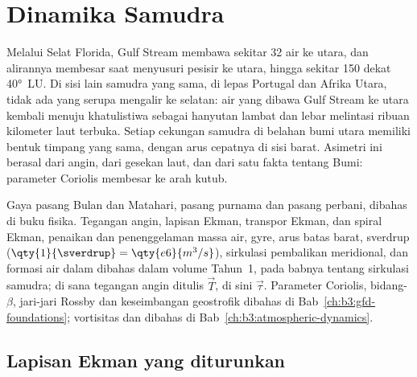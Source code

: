 \chapter{Dinamika Samudra}\label{ch:b3:ocean-dynamics}

Melalui Selat Florida, Gulf Stream membawa sekitar
\qty{32}{\sverdrup} air ke utara, dan alirannya membesar saat menyusuri pesisir
ke utara, hingga sekitar \qty{150}{\sverdrup} dekat \ang{40}~LU. Di sisi lain samudra yang sama, di lepas Portugal dan
Afrika Utara, tidak ada yang serupa mengalir ke selatan: air yang dibawa Gulf Stream
ke utara kembali menuju khatulistiwa sebagai hanyutan lambat dan lebar melintasi ribuan
kilometer laut terbuka. Setiap cekungan samudra di belahan bumi utara memiliki
bentuk timpang yang sama, dengan arus cepatnya di sisi barat. Asimetri ini
berasal dari angin, dari gesekan laut, dan dari satu
fakta tentang Bumi: parameter Coriolis membesar ke arah kutub.

\begin{recall}
Gaya pasang Bulan dan Matahari, pasang purnama dan pasang perbani, dibahas di
buku fisika. Tegangan angin, lapisan Ekman, transpor Ekman, dan
spiral Ekman, penaikan dan penenggelaman massa air, gyre, arus
batas barat, sverdrup ($\qty{1}{\sverdrup} =
\qty{e6}{m^3/s}$), sirkulasi pembalikan meridional, dan
formasi air dalam dibahas dalam volume Tahun~1, pada babnya tentang
sirkulasi samudra; di sana tegangan angin ditulis $\vec T$, di sini
$\vec\tau$. Parameter Coriolis, bidang-$\beta$, jari-jari Rossby
dan keseimbangan geostrofik dibahas di Bab~\ref{ch:b3:gfd-foundations};
vortisitas dan  dibahas di Bab~\ref{ch:b3:atmospheric-dynamics}.
\end{recall}

\section{Lapisan Ekman yang diturunkan}\label{sec:b3:ocean-dynamics:ekman}

